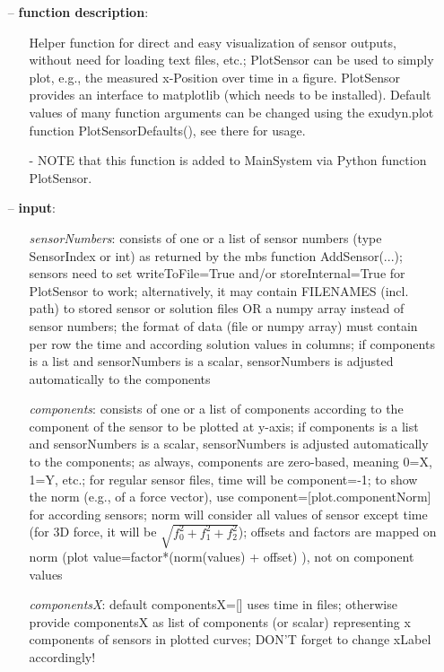 \begin{itemize}[leftmargin=0.7cm]
\item[--]
{\bf function description}: \vspace{-6pt}
\begin{itemize}[leftmargin=1.2cm]
\setlength{\itemindent}{-0.7cm}
\item[]Helper function for direct and easy visualization of sensor outputs, without need for loading text files, etc.; PlotSensor can be used to simply plot, e.g., the measured x-Position over time in a figure. PlotSensor provides an interface to matplotlib (which needs to be installed). Default values of many function arguments can be changed using the exudyn.plot function PlotSensorDefaults(), see there for usage.
\item[]- NOTE that this function is added to MainSystem via Python function PlotSensor.
\end{itemize}
\item[--]
{\bf input}: \vspace{-6pt}
\begin{itemize}[leftmargin=1.2cm]
\setlength{\itemindent}{-0.7cm}
\item[]{\it sensorNumbers}: consists of one or a list of sensor numbers (type SensorIndex or int) as returned by the mbs function AddSensor(...); sensors need to set writeToFile=True and/or storeInternal=True for PlotSensor to work; alternatively, it may contain FILENAMES (incl. path) to stored sensor or solution files OR a numpy array instead of sensor numbers; the format of data (file or numpy array) must contain per row the time and according solution values in columns; if components is a list and sensorNumbers is a scalar, sensorNumbers is adjusted automatically to the components
\item[]{\it components}: consists of one or a list of components according to the component of the sensor to be plotted at y-axis; if components is a list and sensorNumbers is a scalar, sensorNumbers is adjusted automatically to the components; as always, components are zero-based, meaning 0=X, 1=Y, etc.; for regular sensor files, time will be component=-1; to show the norm (e.g., of a force vector), use component=[plot.componentNorm] for according sensors; norm will consider all values of sensor except time (for 3D force, it will be $\sqrt{f_0^2+f_1^2+f_2^2}$); offsets and factors are mapped on norm (plot value=factor*(norm(values) + offset) ), not on component values
\item[]{\it componentsX}: default componentsX=[] uses time in files; otherwise provide componentsX as list of components (or scalar) representing x components of sensors in plotted curves; DON'T forget to change xLabel accordingly!

\end{itemize}
\end{itemize}

